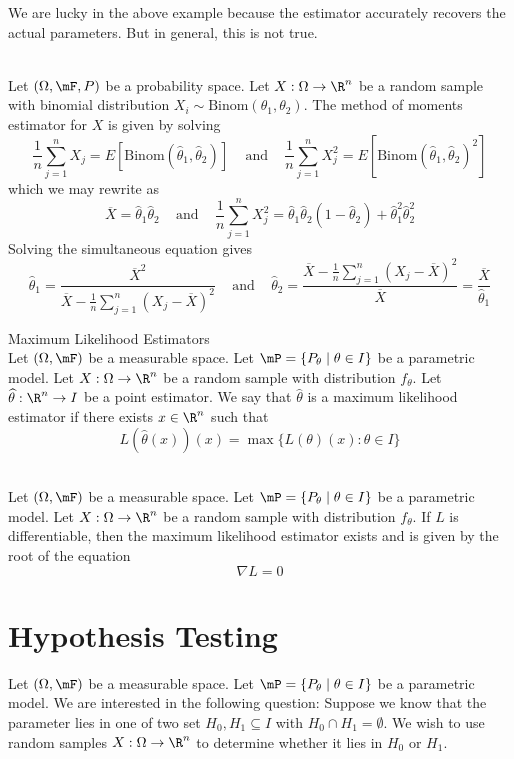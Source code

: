 \documentclass[a4paper]{article}
\begin{document}
We are lucky in the above example because the estimator accurately recovers the actual parameters. But in general, this is not true. 

\begin{eg}{}{}\\
Let $(\Omega,\mF,P)$ be a probability space. Let $X:\Omega\to\R^n$ be a random sample with binomial distribution $X_i\sim\text{Binom}(\theta_1,\theta_2)$. The method of moments estimator for $X$ is given by solving $$\frac{1}{n}\sum_{j=1}^nX_j=E[\text{Binom}(\widehat{\theta}_1,\widehat{\theta}_2)]\;\;\;\text{ and }\;\;\;\frac{1}{n}\sum_{j=1}^nX_j^2=E[\text{Binom}(\widehat{\theta}_1,\widehat{\theta}_2)^2]$$ which we may rewrite as $$\overline{X}=\widehat{\theta}_1\widehat{\theta}_2\;\;\;\text{ and }\;\;\;\frac{1}{n}\sum_{j=1}^nX_j^2=\widehat{\theta}_1\widehat{\theta}_2(1-\widehat{\theta}_2)+\widehat{\theta}_1^2\widehat{\theta}_2^2$$ Solving the simultaneous equation gives $$\widehat{\theta}_1=\frac{\overline{X}^2}{\overline{X}-\frac{1}{n}\sum_{j=1}^n(X_j-\overline{X})^2}\;\;\;\text{ and }\;\;\;\widehat{\theta}_2=\frac{\overline{X}-\frac{1}{n}\sum_{j=1}^n(X_j-\overline{X})^2}{\overline{X}}=\frac{\overline{X}}{\widehat{\theta}_1}$$
\end{eg}

\begin{defn}{Maximum Likelihood Estimators}{}\\
Let $(\Omega,\mF)$ be a measurable space. Let $\mP=\{P_\theta\;|\;\theta\in I\}$ be a parametric model. Let $X:\Omega\to\R^n$ be a random sample with distribution $f_\theta$. Let $\widehat{\theta}:\R^n\to I$ be a point estimator. We say that $\widehat{\theta}$ is a maximum likelihood estimator if there exists $x\in\R^n$ such that $$L(\widehat{\theta}(x))(x)=\max\{L(\theta)(x):\theta\in I\}$$
\end{defn}

\begin{lmm}{}{}\\
Let $(\Omega,\mF)$ be a measurable space. Let $\mP=\{P_\theta\;|\;\theta\in I\}$ be a parametric model. Let $X:\Omega\to\R^n$ be a random sample with distribution $f_\theta$. If $L$ is differentiable, then the maximum likelihood estimator exists and is given by the root of the equation $$\nabla L=0$$
\end{lmm}

\pagebreak
\section{Hypothesis Testing}
Let $(\Omega,\mF)$ be a measurable space. Let $\mP=\{P_\theta\;|\;\theta\in I\}$ be a parametric model. We are interested in the following question: Suppose we know that the parameter lies in one of two set $H_0,H_1\subseteq I$ with $H_0\cap H_1=\emptyset$. We wish to use random samples $X:\Omega\to\R^n$ to determine whether it lies in $H_0$ or $H_1$. 
\end{document}
